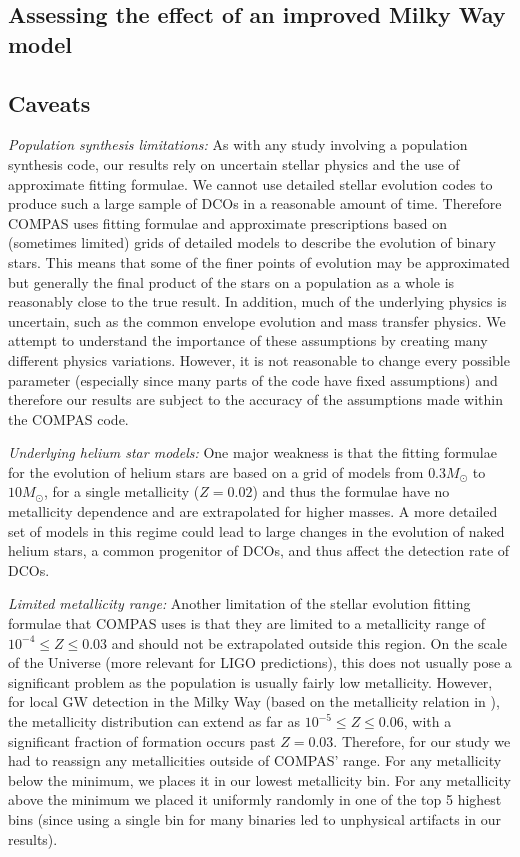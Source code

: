 \subsection{Assessing the effect of an improved Milky Way model}

\subsection{Caveats}\label{sec:caveats}
\textit{Population synthesis limitations:} As with any study involving a population synthesis code, our results rely on uncertain stellar physics and the use of approximate fitting formulae. We cannot use detailed stellar evolution codes to produce such a large sample of DCOs in a reasonable amount of time. Therefore COMPAS uses fitting formulae and approximate prescriptions based on (sometimes limited) grids of detailed models to describe the evolution of binary stars. This means that some of the finer points of evolution may be approximated but generally the final product of the stars on a population as a whole is reasonably close to the true result. In addition, much of the underlying physics is uncertain, such as the common envelope evolution and mass transfer physics. We attempt to understand the importance of these assumptions by creating many different physics variations. However, it is not reasonable to change every possible parameter (especially since many parts of the code have fixed assumptions) and therefore our results are subject to the accuracy of the assumptions made within the COMPAS code.

\textit{Underlying helium star models:} One major weakness is that the \citet{Hurley+2000} fitting formulae for the evolution of helium stars are based on a grid of models from $0.3 \unit{M_{\odot}}$ to $10 \unit{M_{\odot}}$, for a single metallicity ($Z= 0.02$) and thus the formulae have no metallicity dependence and are extrapolated for higher masses. A more detailed set of models in this regime could lead to large changes in the evolution of naked helium stars, a common progenitor of DCOs, and thus affect the detection rate of DCOs.

\textit{Limited metallicity range:} Another limitation of the stellar evolution fitting formulae that COMPAS uses is that they are limited to a metallicity range of $10^{-4} \le Z \le 0.03$ and should not be extrapolated outside this region. On the scale of the Universe (more relevant for LIGO predictions), this does not usually pose a significant problem as the population is usually fairly low metallicity. However, for local GW detection in the Milky Way (based on the metallicity relation in \citet{Frankel+2018}), the metallicity distribution can extend as far as $10^{-5} \le Z \le 0.06$, with a significant fraction of formation occurs past $Z = 0.03$. Therefore, for our study we had to reassign any metallicities outside of COMPAS' range. For any metallicity below the minimum, we places it in our lowest metallicity bin. For any metallicity above the minimum we placed it uniformly randomly in one of the top 5 highest bins (since using a single bin for many binaries led to unphysical artifacts in our results).

